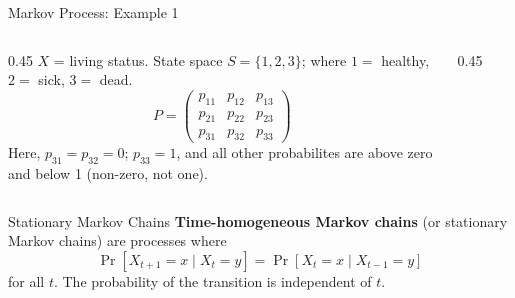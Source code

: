 \documentclass[aspectratio=169]{beamer}
\begin{document}
    \begin{frame}{Markov Process: Example 1}
        \begin{columns}
            \begin{column}{0.45\textwidth}
                $X$ = living status. State space $S = \{1, 2, 3\}$; where $1 =$ healthy, \\
                $2 =$ sick, $3 =$ dead.
                \[
                    P = \begin{pmatrix} p_{11} & p_{12} & p_{13} \\ p_{21} & p_{22} & p_{23} \\ p_{31} & p_{32} & p_{33} \end{pmatrix}
                \]
                Here, $p_{31} = p_{32} = 0$; $p_{33} = 1$, and all other probabilites are above zero and below 1 (non-zero, not one).
            \end{column}
            \begin{column}{0.45\textwidth}
                \begin{figure}
                \centering
                \end{figure}
            \end{column}
        \end{columns}
    \end{frame}
 
 
    \begin{frame}{Stationary Markov Chains}
        \textbf{Time-homogeneous Markov chains} (or stationary Markov chains) are processes where
        \[
            \Pr[X_{t+1} = x \mid X_t = y] = \Pr[X_t = x \mid X_{t-1} = y]
        \]
        for all $t$. The probability of the transition is independent of $t$.
    \end{frame}
 
\end{document}
